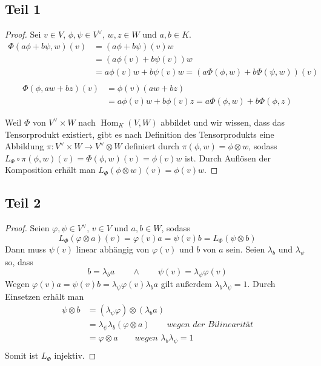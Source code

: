 \documentclass[10pt,a4paper]{article}
\DeclareMathOperator{\Hom}{Hom}
\begin{document}
\subsection*{Teil 1}

\begin{proof}
Sei $v \in V$, $\phi, \psi \in V^{\vee}$, $w, z \in W$ und $a, b \in K$.
\begin{align*}
\Phi(a \phi + b \psi, w)(v) & = (a \phi + b \psi)(v) w\\
& = (a \phi(v) + b \psi(v)) w\\
& = a \phi(v) w + b \psi(v)w = (a \Phi(\phi, w) + b \Phi(\psi, w))(v)\\
\end{align*}
\begin{align*}
\Phi(\phi, aw + bz)(v) & = \phi(v) (aw + bz)\\
& = a \phi(v)w + b \phi(v)z = a \Phi(\phi, w) + b \Phi(\phi, z)
\end{align*}

Weil $\Phi$ von $V^{\vee} \times W$ nach $\Hom_{K}(V, W)$ abbildet und wir wissen, dass das Tensorprodukt existiert, gibt es nach Definition des Tensorprodukts eine Abbildung $\pi: V^{\vee} \times W \rightarrow V^{\vee} \otimes W$ definiert durch $\pi(\phi, w) = \phi \otimes w$, sodass $L_{\Phi} \circ \pi (\phi, w)(v) = \Phi(\phi, w)(v) = \phi(v) w$ ist.
Durch Auflösen der Komposition erhält man $L_{\Phi}(\phi \otimes w)(v) = \phi(v)w$.
\end{proof}

\subsection*{Teil 2}

\begin{proof}
Seien $\varphi, \psi \in V^{\vee}$, $v \in V$ und $a, b \in W$, sodass
\begin{equation}
L_{\Phi}(\varphi \otimes a)(v) = \varphi(v) a = \psi(v) b = L_{\Phi}(\psi \otimes b)
\end{equation}
Dann muss $\psi(v)$ linear abhängig von $\varphi(v)$ und $b$ von $a$ sein.
Seien $\lambda_{b}$ und $\lambda_{\psi}$ so, dass
\begin{equation}
b = \lambda_{b} a \qquad \land \qquad \psi(v) = \lambda_{\psi} \varphi(v)
\end{equation}
Wegen $\varphi(v) a = \psi(v) b = \lambda_{\psi} \varphi(v) \lambda_{b} a$ gilt außerdem $\lambda_{b}\lambda_{\psi} = 1$.
Durch Einsetzen erhält man
\begin{align*}
\psi \otimes b & = (\lambda_{\psi} \varphi) \otimes (\lambda_{b} a)\\
& = \lambda_{\psi} \lambda_{b} (\varphi \otimes a) \qquad \textit{wegen der Bilinearität}\\
& = \varphi \otimes a \qquad \textit{wegen $\lambda_{b}\lambda_{\psi} = 1$}\\
\end{align*}
Somit ist $L_{\Phi}$ injektiv.
\end{proof}
\end{document}
